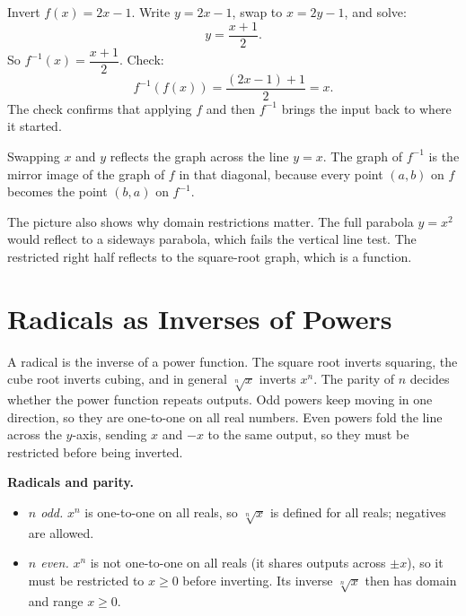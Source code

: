 \documentclass[12pt]{book}
\begin{document}
\begin{example}
Invert $f(x)=2x-1$. Write $y=2x-1$, swap to $x=2y-1$, and solve:
\[
y=\frac{x+1}{2}.
\]
So $f^{-1}(x)=\dfrac{x+1}{2}$. Check:
\[
f^{-1}(f(x))=\frac{(2x-1)+1}{2}=x.
\]
The check confirms that applying $f$ and then $f^{-1}$ brings the input back to where
it started.
\end{example}

\begin{visual}
Swapping $x$ and $y$ reflects the graph across the line $y=x$. The graph of $f^{-1}$
is the mirror image of the graph of $f$ in that diagonal, because every point $(a,b)$
on $f$ becomes the point $(b,a)$ on $f^{-1}$.
\end{visual}

\begin{center}
\end{center}

The picture also shows why domain restrictions matter. The full parabola $y=x^2$ would
reflect to a sideways parabola, which fails the vertical line test. The restricted right
half reflects to the square-root graph, which is a function.

\section{Radicals as Inverses of Powers}

A radical is the inverse of a power function. The square root inverts squaring, the cube
root inverts cubing, and in general $\sqrt[n]{x}$ inverts $x^n$. The parity of $n$
decides whether the power function repeats outputs. Odd powers keep moving in one
direction, so they are one-to-one on all real numbers. Even powers fold the line across
the $y$-axis, sending $x$ and $-x$ to the same output, so they must be restricted before
being inverted.

\begin{keyidea}
\textbf{Radicals and parity.}
\begin{itemize}\setlength{\itemsep}{2pt}
  \item \emph{$n$ odd.} $x^n$ is one-to-one on all reals, so $\sqrt[n]{x}$ is defined
        for all reals; negatives are allowed.
  \item \emph{$n$ even.} $x^n$ is not one-to-one on all reals (it shares outputs
        across $\pm x$), so it must be restricted to $x\ge0$ before inverting.
        Its inverse $\sqrt[n]{x}$ then has domain and range $x\ge0$.
\end{itemize}
\end{keyidea}
\end{document}
